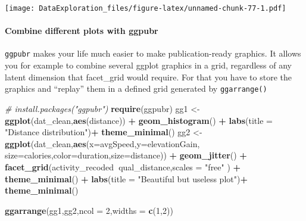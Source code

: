 \documentclass[
]{book}
\newenvironment{Shaded}{\begin{snugshade}}{\end{snugshade}}
\newcommand{\CommentTok}[1]{\textcolor[rgb]{0.56,0.35,0.01}{\textit{#1}}}
\newcommand{\DataTypeTok}[1]{\textcolor[rgb]{0.13,0.29,0.53}{#1}}
\newcommand{\DecValTok}[1]{\textcolor[rgb]{0.00,0.00,0.81}{#1}}
\newcommand{\KeywordTok}[1]{\textcolor[rgb]{0.13,0.29,0.53}{\textbf{#1}}}
\newcommand{\NormalTok}[1]{#1}
\newcommand{\OperatorTok}[1]{\textcolor[rgb]{0.81,0.36,0.00}{\textbf{#1}}}
\newcommand{\StringTok}[1]{\textcolor[rgb]{0.31,0.60,0.02}{#1}}
\begin{document}
\texttt{[image: DataExploration\_files/figure-latex/unnamed-chunk-77-1.pdf]}

\hypertarget{combine-different-plots-with-ggpubr}{%
\paragraph{Combine different plots with ggpubr}\label{combine-different-plots-with-ggpubr}}

\texttt{ggpubr} makes your life much easier to make publication-ready graphics. It allows you for example to combine several ggplot graphics in a grid, regardless of any latent dimension that facet\_grid would require. For that you have to store the graphics and ``replay'' them in a defined grid generated by \texttt{ggarrange()}

\begin{Shaded}
\begin{Highlighting}[]
\CommentTok{# install.packages("ggpubr")}
\KeywordTok{require}\NormalTok{(ggpubr)}
\NormalTok{gg1 <-}\StringTok{ }\KeywordTok{ggplot}\NormalTok{(dat_clean,}\KeywordTok{aes}\NormalTok{(distance)) }\OperatorTok{+}\StringTok{ }\KeywordTok{geom_histogram}\NormalTok{() }\OperatorTok{+}\StringTok{ }
\StringTok{  }\KeywordTok{labs}\NormalTok{(}\DataTypeTok{title =} \StringTok{"Distance distribution"}\NormalTok{)}\OperatorTok{+}
\StringTok{  }\KeywordTok{theme_minimal}\NormalTok{()}
\NormalTok{gg2 <-}\StringTok{ }\KeywordTok{ggplot}\NormalTok{(dat_clean,}\KeywordTok{aes}\NormalTok{(}\DataTypeTok{x=}\NormalTok{avgSpeed,}\DataTypeTok{y=}\NormalTok{elevationGain,}
                            \DataTypeTok{size=}\NormalTok{calories,}\DataTypeTok{color=}\NormalTok{duration,}\DataTypeTok{size=}\NormalTok{distance)) }\OperatorTok{+}\StringTok{ }
\StringTok{  }\KeywordTok{geom_jitter}\NormalTok{() }\OperatorTok{+}\StringTok{ }
\StringTok{  }\KeywordTok{facet_grid}\NormalTok{(activity_recoded}\OperatorTok{~}\NormalTok{qual_distance,}\DataTypeTok{scales =} \StringTok{"free"}\NormalTok{ ) }\OperatorTok{+}
\StringTok{  }\KeywordTok{theme_minimal}\NormalTok{() }\OperatorTok{+}\StringTok{ }\KeywordTok{labs}\NormalTok{(}\DataTypeTok{title =} \StringTok{"Beautiful but useless plot"}\NormalTok{)}\OperatorTok{+}
\StringTok{  }\KeywordTok{theme_minimal}\NormalTok{()}

\KeywordTok{ggarrange}\NormalTok{(gg1,gg2,}\DataTypeTok{ncol =} \DecValTok{2}\NormalTok{,}\DataTypeTok{widths =} \KeywordTok{c}\NormalTok{(}\DecValTok{1}\NormalTok{,}\DecValTok{2}\NormalTok{))}
\end{Highlighting}
\end{Shaded}
\end{document}
